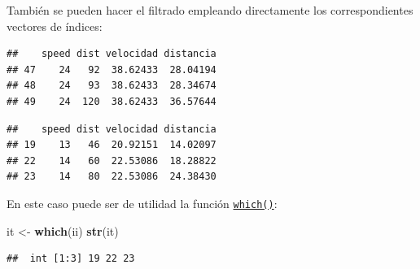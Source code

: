 \documentclass[]{book}
\newenvironment{Shaded}{\begin{snugshade}}{\end{snugshade}}
\newcommand{\CommentTok}[1]{\textcolor[rgb]{0.56,0.35,0.01}{\textit{#1}}}
\newcommand{\DecValTok}[1]{\textcolor[rgb]{0.00,0.00,0.81}{#1}}
\newcommand{\KeywordTok}[1]{\textcolor[rgb]{0.13,0.29,0.53}{\textbf{#1}}}
\newcommand{\NormalTok}[1]{#1}
\newcommand{\OperatorTok}[1]{\textcolor[rgb]{0.81,0.36,0.00}{\textbf{#1}}}
\newcommand{\StringTok}[1]{\textcolor[rgb]{0.31,0.60,0.02}{#1}}
\begin{document}
También se pueden hacer el filtrado empleando directamente los
correspondientes vectores de índices:

\begin{Shaded}
\end{Shaded}

\begin{verbatim}
##    speed dist velocidad distancia
## 47    24   92  38.62433  28.04194
## 48    24   93  38.62433  28.34674
## 49    24  120  38.62433  36.57644
\end{verbatim}

\begin{Shaded}
\end{Shaded}

\begin{verbatim}
##    speed dist velocidad distancia
## 19    13   46  20.92151  14.02097
## 22    14   60  22.53086  18.28822
## 23    14   80  22.53086  24.38430
\end{verbatim}

En este caso puede ser de utilidad la función \href{https://www.rdocumentation.org/packages/base/versions/3.6.1/topics/which}{\texttt{which()}}:

\begin{Shaded}
\begin{Highlighting}[]
\NormalTok{it <-}\StringTok{ }\KeywordTok{which}\NormalTok{(ii)}
\KeywordTok{str}\NormalTok{(it)}
\end{Highlighting}
\end{Shaded}

\begin{verbatim}
##  int [1:3] 19 22 23
\end{verbatim}
\end{document}
